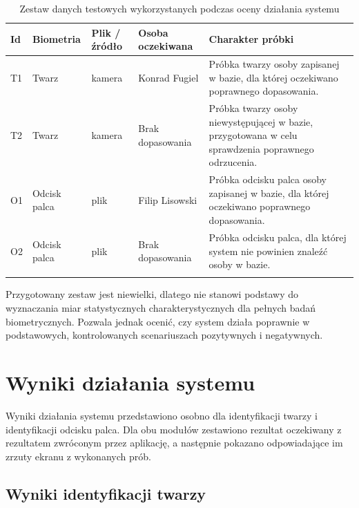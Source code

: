 \renewcommand{\arraystretch}{1.15}
\begin{xltabular}{\textwidth}{|
    >{\RaggedRight\arraybackslash}p{0.8cm}|
    >{\RaggedRight\arraybackslash}p{1.9cm}|
    >{\RaggedRight\arraybackslash}p{1.9cm}|
    >{\RaggedRight\arraybackslash}p{2.9cm}|
    >{\RaggedRight\arraybackslash}X|}

    \hline
    \textbf{Id} & \textbf{Biometria} & \textbf{Plik / źródło} & \textbf{Osoba oczekiwana} & \textbf{Charakter próbki} \\
    \hline
    \endfirsthead

    T1 & Twarz & kamera & Konrad Fugiel & Próbka twarzy osoby zapisanej w bazie, dla której oczekiwano poprawnego dopasowania. \\
    \hline
    T2 & Twarz & kamera & Brak dopasowania & Próbka twarzy osoby niewystępującej w bazie, przygotowana w celu sprawdzenia poprawnego odrzucenia. \\
    \hline
    O1 & Odcisk palca & plik & Filip Lisowski & Próbka odcisku palca osoby zapisanej w bazie, dla której oczekiwano poprawnego dopasowania. \\
    \hline
    O2 & Odcisk palca & plik & Brak dopasowania & Próbka odcisku palca, dla której system nie powinien znaleźć osoby w bazie. \\
    \hline

    \caption{Zestaw danych testowych wykorzystanych podczas oceny działania systemu}
    \label{tab:dane-testowe}
\end{xltabular}

Przygotowany zestaw jest niewielki, dlatego nie stanowi podstawy do wyznaczania miar statystycznych charakterystycznych dla pełnych badań biometrycznych. Pozwala jednak ocenić, czy system działa poprawnie w podstawowych, kontrolowanych scenariuszach pozytywnych i negatywnych.

\section{Wyniki działania systemu}

Wyniki działania systemu przedstawiono osobno dla identyfikacji twarzy i identyfikacji odcisku palca. Dla obu modułów zestawiono rezultat oczekiwany z rezultatem zwróconym przez aplikację, a następnie pokazano odpowiadające im zrzuty ekranu z wykonanych prób.

\subsection{Wyniki identyfikacji twarzy}

